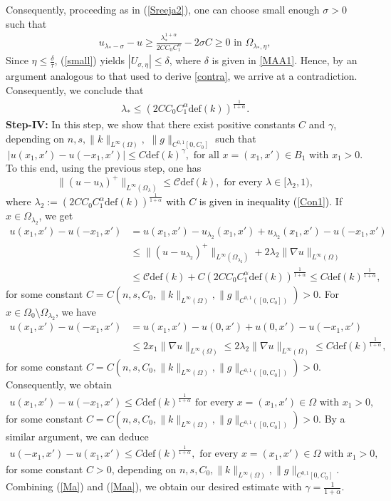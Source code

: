 \documentclass[11pt, notitlepage]{article}
\begin{document}
{Consequently, proceeding as in (\ref{Sreeja2}), one can choose small enough $\sigma>0$ such that
\begin{align*}
    u_{\lambda_*-\sigma}-u\geq \frac{\lambda_*^{1+\alpha}}{2CC_0C_1^\alpha}-2\sigma C\geq 0\text{ in }\Omega_{\lambda_*,\eta},
\end{align*}
Since $\eta\leq \frac{\delta}{\tau}$, (\ref{small}) yields $|U_{\sigma,\eta}|\leq \delta$, where $\delta$ is given in \textcolor{black}{\eqref{MAA1}}. Hence, by an argument analogous to that used to derive \textcolor{black}{\eqref{contra}}, we arrive at a contradiction. Consequently, we conclude that 
\begin{align*}
    \lambda_*\leq (2CC_0C_1^\alpha\mathrm{def}(k))^\frac{1}{1+\alpha}.
\end{align*}
\textbf{Step-IV:} In this step, we show that there exist positive constants $C$ and $\gamma$, depending on $n,s,\|k\|_{L^\infty(\Omega)},$ $\|g\|_{C^{0,1}[0,C_0]}$ such that $$|u(x_1,x')-u(-x_1,x')|\leq C\mathrm{def}(k)^\gamma,\text{ for all }x=(x_1,x')\in B_1\text{ with }x_1>0.$$ To this end, using the previous step, one has
$$\|(u-u_\lambda)^+\|_{L^\infty(\Omega_\lambda)}\leq \mathcal{C}\mathrm{def}(k),\text{ for every }\lambda\in[\lambda_2,1),$$
where $\lambda_2:=(2CC_0C_1^\alpha\mathrm{def}(k))^\frac{1}{1+\alpha}$ \textcolor{black}{with $C$ is given in inequality (\ref{Con1})}. If $x\in \Omega_{\lambda_2}$, we get
\begin{align*}
    u(x_1,x')-u(-x_1,x')&=u(x_1,x')-u_{\lambda_2}(x_1,x')+u_{\lambda_2}(x_1,x')-u(-x_1,x')\nonumber\\
    &\leq \|(u-u_{\lambda_2})^+\|_{L^\infty(\Omega_{\lambda_2})}+2\lambda_2\|\nabla u\|_{L^\infty(\Omega)}\nonumber\\
    &\leq \mathcal{C}\mathrm{def}(k)+C(2CC_0C_1^\alpha\mathrm{def}(k))^\frac{1}{1+\alpha}\leq C\mathrm{def}(k)^\frac{1}{1+\alpha},
\end{align*}
for some constant $C=C(n,s,C_0,\|k\|_{L^\infty(\Omega)},\|g\|_{C^{0,1}([0,C_0])})>0$.
For $x\in \Omega_0\setminus\Omega_{\lambda_2}$, we have
\begin{align*}
    u(x_1,x')-u(-x_1,x')&=u(x_1,x')-u(0,x')+u(0,x')-u(-x_1,x')\nonumber\\
    &\leq 2x_1\|\nabla u\|_{L^\infty(\Omega)}\leq 2\lambda_2\|\nabla u\|_{L^\infty(\Omega)}\leq C\mathrm{def}(k)^\frac{1}{1+\alpha},
\end{align*}
for some constant $C=C(n,s,C_0,\|k\|_{L^\infty(\Omega)},\|g\|_{C^{0,1}([0,C_0])})>0$. Consequently, we obtain
\begin{align}\label{Ma}
    u(x_1,x')-u(-x_1,x')\leq C\mathrm{def}(k)^\frac{1}{1+\alpha} \mbox{ for every } x=(x_1,x')\in \Omega \mbox{ with }x_1>0,
\end{align}
for some constant $C=C(n,s,C_0,\|k\|_{L^\infty(\Omega)},\|g\|_{C^{0,1}([0,C_0])})>0$. By a similar argument, we can deduce
\begin{align}\label{Maa}
    u(-x_1,x')-u(x_1,x')\leq C\mathrm{def}(k)^\frac{1}{1+\alpha}, \mbox{ for every } x=(x_1,x')\in \Omega \mbox{ with }x_1>0,
\end{align}
for some constant $C>0$, depending on $n,s,C_0,\|k\|_{L^\infty(\Omega)}, \|g\|_{C^{0,1}[0,C_0]}$. Combining (\ref{Ma}) and (\ref{Maa}), we obtain our desired estimate with $\gamma=\frac{1}{1+\alpha}$.
}
\end{document}
